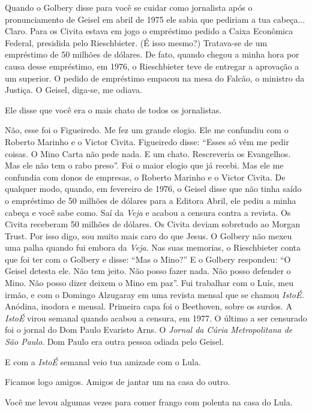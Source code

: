  Quando o Golbery disse para você se cuidar como jornalista após o
pronunciamento de Geisel em abril de 1975 ele sabia que pediriam a tua
cabeça...  Claro. Para os Civita estava em jogo o empréstimo pedido a
Caixa Econômica Federal, presidida pelo Rieschbieter. (É isso mesmo?)
Tratava-se de um empréstimo de 50 milhões de dólares. De fato, quando
chegou a minha hora por causa desse empréstimo, em 1976, o Rieschbieter
teve de entregar a aprovação a um superior. O pedido de empréstimo
empacou na mesa do Falcão, o ministro da Justiça. O Geisel, diga-se, me
odiava.

 Ele disse que você era o mais chato de todos os jornalistas.

 Não, esse foi o Figueiredo. Me fez um grande elogio. Ele me confundiu
com o Roberto Marinho e o Victor Civita. Figueiredo disse: ``Esses só
vêm me pedir coisas. O Mino Carta não pede nada. E um chato. Rescreveria
os Evangelhos. Mas ele não tem o rabo preso''. Foi o maior elogio que já
recebi. Mas ele me confundia com donos de empresas, o Roberto Marinho e
o Victor Civita. De qualquer modo, quando, em fevereiro de 1976, o
Geisel disse que não tinha saído o empréstimo de 50 milhões de dólares
para a Editora Abril, ele pediu a minha cabeça e você sabe como. Saí da
\emph{Veja} e acabou a censura contra a revista. Os Civita receberam 50
milhões de dólares. Os Civita deviam sobretudo ao Morgan Trust. Por isso
digo, sou muito mais caro do que Jesus. O Golbery não mexeu uma palha
quando fui embora da \emph{Veja}. Nas suas memorias, o Rieschbieter
conta que foi ter com o Golbery e disse: ``Mas o Mino?'' E o Golbery
respondeu: ``O Geisel detesta ele. Não tem jeito. Não posso fazer nada.
Não posso defender o Mino. Não posso dizer deixem o Mino em paz''. Fui
trabalhar com o Luís, meu irmão, e com o Domingo Alzugaray em uma
revista mensal que se chamou \emph{IstoÉ.} Anódina, inodora e mensal.
Primeira capa foi o Beethoven, sobre os surdos. A \emph{IstoÉ} virou
semanal quando acabou a censura, em 1977. O último a ser censurado foi o
jornal do Dom Paulo Evaristo Arns. O \emph{Jornal da Cúria Metropolitana
de São Paulo}. Dom Paulo era outra pessoa odiada pelo Geisel.

 E com a \emph{IstoÉ} semanal veio tua amizade com o Lula.

 Ficamos logo amigos. Amigos de jantar um na casa do outro.

 Você me levou algumas vezes para comer frango com polenta na casa do
Lula.

